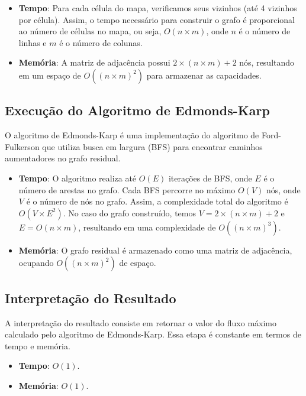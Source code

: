 \documentclass[a4paper,12pt]{article}
\begin{document}
\begin{itemize}
    \item \textbf{Tempo}: Para cada célula do mapa, verificamos seus vizinhos (até 4 vizinhos por célula). Assim, o tempo necessário para construir o grafo é proporcional ao número de células no mapa, ou seja, $O(n \times m)$, onde $n$ é o número de linhas e $m$ é o número de colunas.
    \item \textbf{Memória}: A matriz de adjacência possui $2 \times (n \times m) + 2$ nós, resultando em um espaço de $O((n \times m)^2)$ para armazenar as capacidades.
\end{itemize}

\subsection*{Execução do Algoritmo de Edmonds-Karp}

O algoritmo de Edmonds-Karp é uma implementação do algoritmo de Ford-Fulkerson
que utiliza busca em largura (BFS) para encontrar caminhos aumentadores no
grafo residual.

\begin{itemize}
    \item \textbf{Tempo}: O algoritmo realiza até $O(E)$ iterações de BFS, onde $E$ é o número de arestas no grafo. Cada BFS percorre no máximo $O(V)$ nós, onde $V$ é o número de nós no grafo. Assim, a complexidade total do algoritmo é $O(V \times E^2)$. No caso do grafo construído, temos $V = 2 \times (n \times m) + 2$ e $E = O(n \times m)$, resultando em uma complexidade de $O((n \times m)^3)$.
    \item \textbf{Memória}: O grafo residual é armazenado como uma matriz de adjacência, ocupando $O((n \times m)^2)$ de espaço.
\end{itemize}

\subsection*{Interpretação do Resultado}

A interpretação do resultado consiste em retornar o valor do fluxo máximo
calculado pelo algoritmo de Edmonds-Karp. Essa etapa é constante em termos de
tempo e memória.

\begin{itemize}
    \item \textbf{Tempo}: $O(1)$.
    \item \textbf{Memória}: $O(1)$.
\end{itemize}
\end{document}
